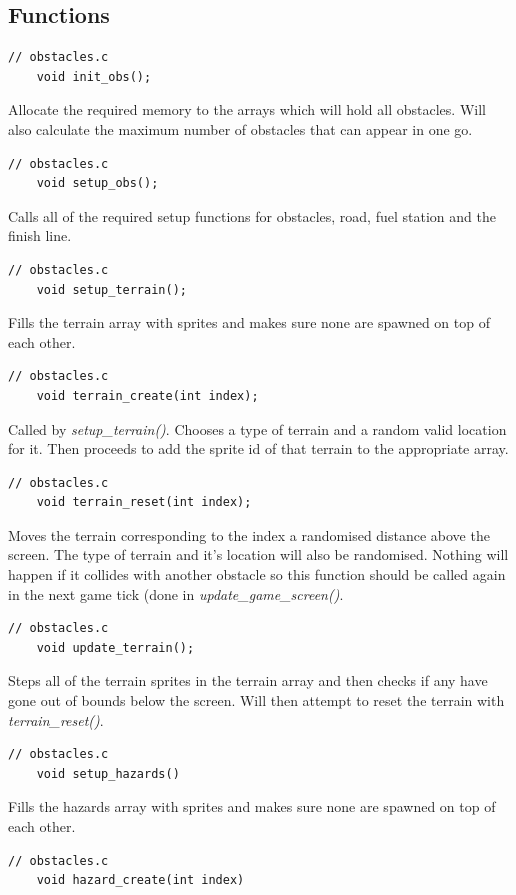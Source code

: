 \documentclass{article}
\begin{document}
\subsection*{Functions}
\begin{lstlisting}[style=CStyle]
	// obstacles.c
	void init_obs();	
\end{lstlisting}
Allocate the required memory to the arrays which will hold all obstacles. Will also calculate the maximum number of obstacles that can appear in one go.
\begin{lstlisting}[style=CStyle]
	// obstacles.c
	void setup_obs();
\end{lstlisting}
Calls all of the required setup functions for obstacles, road, fuel station and the finish line.
\begin{lstlisting}[style=CStyle]
	// obstacles.c
	void setup_terrain();
\end{lstlisting}
Fills the terrain array with sprites and makes sure none are spawned on top of each other.
\begin{lstlisting}[style=CStyle]
	// obstacles.c
	void terrain_create(int index);
\end{lstlisting}
Called by \emph{setup\_terrain()}. Chooses a type of terrain and a random valid location for it. Then proceeds to add the sprite id of that terrain to the appropriate array.
\newpage
\begin{lstlisting}[style=CStyle]
	// obstacles.c
	void terrain_reset(int index);
\end{lstlisting}
Moves the terrain corresponding to the index a randomised distance above the screen. The type of terrain and it's location will also be randomised. Nothing will happen if it collides with another obstacle so this function should be called again in the next game tick (done in \emph{update\_game\_screen()}.
\begin{lstlisting}[style=CStyle]
	// obstacles.c
	void update_terrain();
\end{lstlisting}
Steps all of the terrain sprites in the terrain array and then checks if any have gone out of bounds below the screen. Will then attempt to reset the terrain with \emph{terrain\_reset()}.
\begin{lstlisting}[style=CStyle]
	// obstacles.c
	void setup_hazards() 
\end{lstlisting}
Fills the hazards array with sprites and makes sure none are spawned on top of each other.
\begin{lstlisting}[style=CStyle]
	// obstacles.c
	void hazard_create(int index)
\end{lstlisting}
\end{document}
